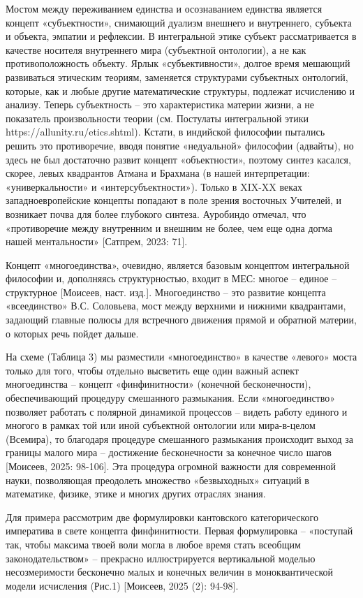     Мостом между переживанием единства и осознаванием единства является концепт «субъектности», снимающий дуализм внешнего и внутреннего, субъекта и объекта, эмпатии и рефлексии. В интегральной этике субъект рассматривается в качестве носителя внутреннего мира (субъектной онтологии), а не как противоположность объекту. Ярлык «субъективности», долгое время мешающий развиваться этическим теориям, заменяется структурами субъектных онтологий, которые, как и любые другие математические структуры, подлежат исчислению и анализу. Теперь субъектность – это характеристика материи жизни, а не показатель произвольности теории (см. Постулаты интегральной этики https://allunity.ru/etics.shtml). Кстати, в индийской философии пытались решить это противоречие, вводя понятие «недуальной» философии (адвайты), но здесь не был достаточно развит концепт «объектности», поэтому синтез касался, скорее, левых квадрантов Атмана и Брахмана (в нашей интерпретации: «универкальности» и «интерсубъектности»). Только в XIX-XX веках западноевропейские концепты попадают в поле зрения восточных Учителей, и возникает почва для более глубокого синтеза. Ауробиндо отмечал, что «противоречие между внутренним и внешним не более, чем еще одна догма нашей ментальности» [Сатпрем, 2023: 71].

    Концепт «многоединства», очевидно, является базовым концептом интегральной философии и, дополняясь структурностью, входит в МЕС: многое – единое – структурное [Моисеев, наст. изд.]. Многоединство – это развитие концепта «всеединство» В.С. Соловьева, мост между верхними и нижними квадрантами, задающий главные полюсы для встречного движения прямой и обратной материи, о которых речь пойдет дальше.

    На схеме (Таблица 3) мы разместили «многоединство» в качестве «левого» моста только для того, чтобы отдельно высветить еще один важный аспект многоединства – концепт «финфинитности» (конечной бесконечности), обеспечивающий процедуру смешанного размыкания. Если «многоединство» позволяет работать с полярной динамикой процессов – видеть работу единого и многого в рамках той или иной субъектной онтологии или мира-в-целом (Всемира), то благодаря процедуре смешанного размыкания происходит выход за границы малого мира – достижение бесконечности за конечное число шагов [Моисеев, 2025: 98-106]. Эта процедура огромной важности для современной науки, позволяющая преодолеть множество «безвыходных» ситуаций в математике, физике, этике и многих других отраслях знания.

    Для примера рассмотрим две формулировки кантовского категорического императива в свете концепта финфинитности. Первая формулировка – «поступай так, чтобы максима твоей воли могла в любое время стать всеобщим законодательством» – прекрасно иллюстрируется вертикальной моделью несозмеримости бесконечно малых и конечных величин в моноквантической модели исчисления (Рис.1) [Моисеев, 2025 (2): 94-98].

